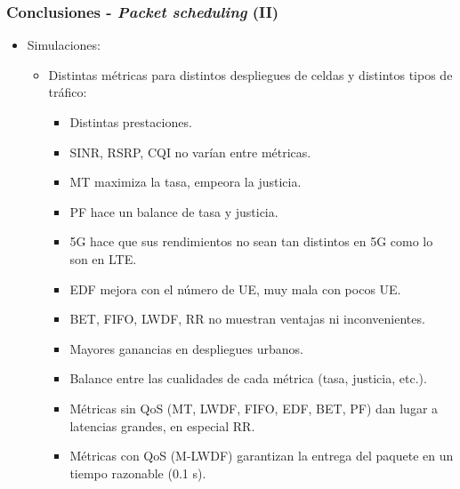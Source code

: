 \documentclass{beamer}
\begin{document}
\begin{frame}
\frametitle{Conclusiones - \textit{Packet scheduling} (II)}

\begin{itemize}
\item {
	Simulaciones:
	\begin{itemize}
	\item {
		Distintas métricas para distintos despliegues de celdas y distintos tipos de tráfico:
		\begin{itemize}
		\item Distintas prestaciones.
		\item SINR, RSRP, CQI no varían entre métricas.
		\item MT maximiza la tasa, empeora la justicia.
		\item PF hace un balance de tasa y justicia.
		\item 5G hace que sus rendimientos no sean tan distintos en 5G como lo son en LTE.
		\item EDF mejora con el número de UE, muy mala con pocos UE.
		\item BET, FIFO, LWDF, RR no muestran ventajas ni inconvenientes.
		\item Mayores ganancias en despliegues urbanos.
		\item Balance entre las cualidades de cada métrica (tasa, justicia, etc.).
		\item Métricas sin QoS (MT, LWDF, FIFO, EDF, BET, PF) dan lugar a latencias grandes, en especial RR.
		\item Métricas con QoS (M-LWDF) garantizan la entrega del paquete en un tiempo razonable (0.1 s).
		\end{itemize}
	}
	\end{itemize}
}
\end{itemize}
\end{frame}
\end{document}
